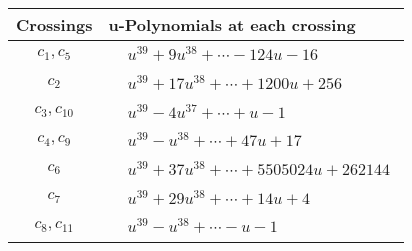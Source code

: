 \documentclass[1p]{elsarticle_modified}
\theoremstyle{definition}
\begin{document}
\begin{tabular}{m{50pt}|m{274pt}}
Crossings & \hspace{64pt}u-Polynomials at each crossing \\
\hline $$\begin{aligned}c_{1},c_{5}\end{aligned}$$&$\begin{aligned}
&u^{39}+9 u^{38}+\cdots-124 u-16
\end{aligned}$\\
\hline $$\begin{aligned}c_{2}\end{aligned}$$&$\begin{aligned}
&u^{39}+17 u^{38}+\cdots+1200 u+256
\end{aligned}$\\
\hline $$\begin{aligned}c_{3},c_{10}\end{aligned}$$&$\begin{aligned}
&u^{39}-4 u^{37}+\cdots+u-1
\end{aligned}$\\
\hline $$\begin{aligned}c_{4},c_{9}\end{aligned}$$&$\begin{aligned}
&u^{39}- u^{38}+\cdots+47 u+17
\end{aligned}$\\
\hline $$\begin{aligned}c_{6}\end{aligned}$$&$\begin{aligned}
&u^{39}+37 u^{38}+\cdots+5505024 u+262144
\end{aligned}$\\
\hline $$\begin{aligned}c_{7}\end{aligned}$$&$\begin{aligned}
&u^{39}+29 u^{38}+\cdots+14 u+4
\end{aligned}$\\
\hline $$\begin{aligned}c_{8},c_{11}\end{aligned}$$&$\begin{aligned}
&u^{39}- u^{38}+\cdots- u-1
\end{aligned}$\\
\hline
\end{tabular}\\~\\
\newpage\renewcommand{\arraystretch}{1}
\end{document}
